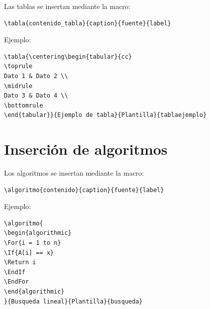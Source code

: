 Las tablas se insertan mediante la macro:

\begin{lstlisting}[caption={Macro de inserción de tablas},label={code:tabla}]
\tabla{contenido_tabla}{caption}{fuente}{label}
\end{lstlisting}



Ejemplo:

\begin{lstlisting}[caption={Ejemplo de código tabla},label={code:tablaej}]
\tabla{\centering\begin{tabular}{cc}
\toprule
Dato 1 & Dato 2 \\
\midrule
Dato 3 & Dato 4 \\
\bottomrule
\end{tabular}}{Ejemplo de tabla}{Plantilla}{tablaejemplo}
\end{lstlisting}





\section{Inserción de algoritmos}

Los algoritmos se insertan mediante la macro:

\begin{lstlisting}[caption={Macro de algoritmos},label={code:algoritmo}]
\algoritmo{contenido}{caption}{fuente}{label}
\end{lstlisting}




Ejemplo:

\begin{lstlisting}[caption={Ejemplo de algoritmo},label={code:algoritmoej}]
\algoritmo{
\begin{algorithmic}
\For{i = 1 to n}
\If{A[i] == x}
\Return i
\EndIf
\EndFor
\end{algorithmic}
}{Busqueda lineal}{Plantilla}{busqueda}
\end{lstlisting}

